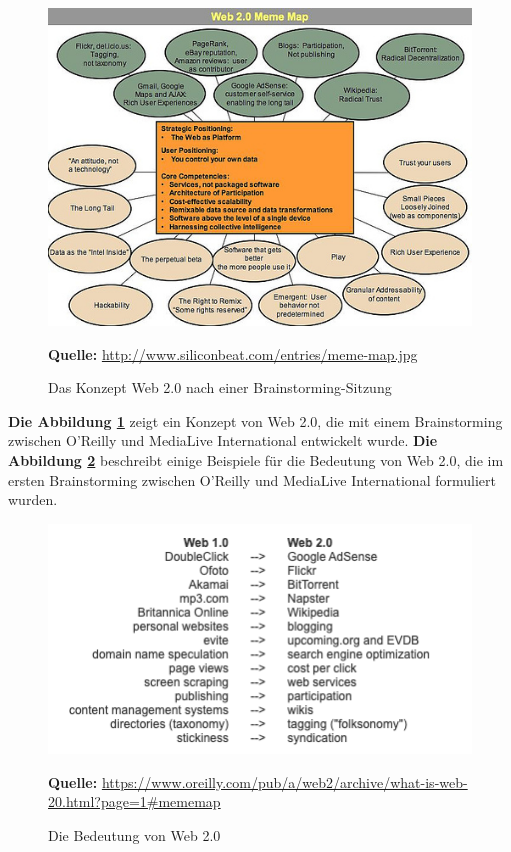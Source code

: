 \begin{figure}[H]
  \begin{center}
    \includegraphics[scale=0.6]{img/web2_map.jpg}
	\caption{Das Konzept Web 2.0 nach einer Brainstorming-Sitzung}
	\footnotesize\sffamily\textbf{Quelle:} \url{http://www.siliconbeat.com/entries/meme-map.jpg} 
	\label{fig:web2_map}
  \end{center}   
\end{figure}

\textbf{Die Abbildung \ref{fig:web2_map}} zeigt ein Konzept von Web 2.0, die mit einem Brainstorming zwischen O’Reilly und MediaLive International entwickelt wurde. \textbf{Die Abbildung \ref{fig:Web1vsWeb2}} beschreibt einige Beispiele für die Bedeutung von Web 2.0, die im ersten Brainstorming zwischen O’Reilly und MediaLive International formuliert wurden.

\begin{figure}[H]
  \begin{center}
    \includegraphics[scale=0.7]{img/web1_vs_web2}
	\caption{Die Bedeutung von Web 2.0}
	\footnotesize\sffamily\textbf{Quelle:} \url{https://www.oreilly.com/pub/a/web2/archive/what-is-web-20.html?page=1#mememap} 
	\label{fig:Web1vsWeb2}
  \end{center}   
\end{figure}

